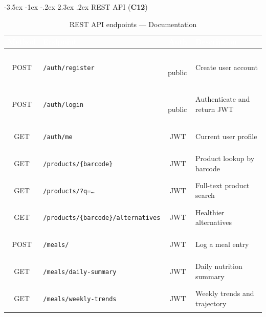 \documentclass[a4paper,11pt,oneside,openany]{report}
\makeatletter
\renewcommand\section{\@startsection{section}{1}{\z@}%
  {-3.5ex \@plus -1ex \@minus -.2ex}%
  {2.3ex \@plus.2ex}%
  {\normalfont\Large\bfseries\color{ntgreen}}}
\newcommand{\competence}[1]{\textbf{\textcolor{ntgreen}{#1}}}
\makeatother
\begin{document}
\section{REST API (\competence{C12})}
\label{sec:c12}

\newcommand{\mGET}{\colorbox{ntgreen}{\color{white}\footnotesize\bfseries\strut\ GET\ }}
\newcommand{\mPOST}{\colorbox{ntorange}{\color{white}\footnotesize\bfseries\strut\ POST\ }}
\newcommand{\authpublic}{\colorbox{ntgray!50}{\color{white}\scriptsize\bfseries\strut\,public\,}}
\newcommand{\authbearer}{\colorbox{ntblue}{\color{white}\scriptsize\bfseries\strut\,JWT\,}}

\begin{table}[H]
\centering
\caption{REST API endpoints --- Documentation}
\label{tab:api}
\small
{}
\begin{tabularx}{\textwidth}{@{}c l c X@{}}
\toprule
\rowcolor{ntgreen}
\textcolor{white}{\textbf{Method}} & \textcolor{white}{\textbf{Endpoint}} & \textcolor{white}{\textbf{Auth}} & \textcolor{white}{\textbf{Description}} \\
\midrule
\mPOST & \texttt{/auth/register} & \authpublic & Create user account \\
\mPOST & \texttt{/auth/login} & \authpublic & Authenticate and return JWT \\
\mGET & \texttt{/auth/me} & \authbearer & Current user profile \\
\mGET & \texttt{/products/\{barcode\}} & \authbearer & Product lookup by barcode \\
\mGET & \texttt{/products/?q=\ldots} & \authbearer & Full-text product search \\
\mGET & \texttt{/products/\{barcode\}/alternatives} & \authbearer & Healthier alternatives \\
\mPOST & \texttt{/meals/} & \authbearer & Log a meal entry \\
\mGET & \texttt{/meals/daily-summary} & \authbearer & Daily nutrition summary \\
\mGET & \texttt{/meals/weekly-trends} & \authbearer & Weekly trends and trajectory \\
\bottomrule
\end{tabularx}
\end{table}
\end{document}

